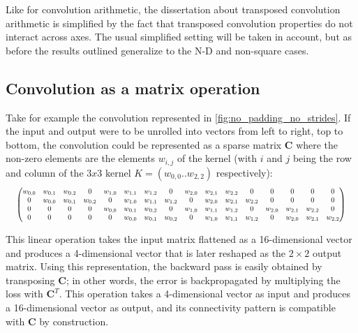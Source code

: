 Like for convolution arithmetic, the dissertation about transposed convolution
arithmetic is simplified by the fact that transposed convolution properties
do not interact across axes. The usual simplified setting will be taken in
account, but as before the results outlined generalize to the N-D and
non-square cases.

\subsection{Convolution as a matrix operation}

Take for example the convolution represented in
\autoref{fig:no_padding_no_strides}. If the input and output were to be unrolled
into vectors from left to right, top to bottom, the convolution could be
represented as a sparse matrix $\mathbf{C}$ where the non-zero elements are the
elements $w_{i,j}$ of the kernel (with $i$ and $j$ being the row and column of
the $3x3$ kernel $K=(w_{0,0}..w_{2, 2})$ respectively):
\begin{equation*}
\setcounter{MaxMatrixCols}{20}
\resizebox{.98\hsize}{!}{$%
    \begin{pmatrix}%
    w_{0,0} & w_{0,1} & w_{0,2} & 0       & w_{1,0} & w_{1,1} & w_{1,2} & 0       &
    w_{2,0} & w_{2,1} & w_{2,2} & 0       & 0       & 0       & 0       & 0       \\
    0       & w_{0,0} & w_{0,1} & w_{0,2} & 0       & w_{1,0} & w_{1,1} & w_{1,2} &
    0       & w_{2,0} & w_{2,1} & w_{2,2} & 0       & 0       & 0       & 0       \\
    0       & 0       & 0       & 0       & w_{0,0} & w_{0,1} & w_{0,2} & 0       &
    w_{1,0} & w_{1,1} & w_{1,2} & 0       & w_{2,0} & w_{2,1} & w_{2,2} & 0       \\
    0       & 0       & 0       & 0       & 0       & w_{0,0} & w_{0,1} & w_{0,2} &
    0       & w_{1,0} & w_{1,1} & w_{1,2} & 0       & w_{2,0} & w_{2,1} & w_{2,2} \\
    \end{pmatrix}$}
\end{equation*}

This linear operation takes the input matrix flattened as a 16-dimensional
vector and produces a 4-dimensional vector that is later reshaped as the $2
\times 2$ output matrix.
Using this representation, the backward pass is easily obtained by transposing
$\mathbf{C}$; in other words, the error is backpropagated by multiplying the
loss with $\mathbf{C}^T$. This operation takes a 4-dimensional vector as input
and produces a 16-dimensional vector as output, and its connectivity pattern is
compatible with $\mathbf{C}$ by construction.

